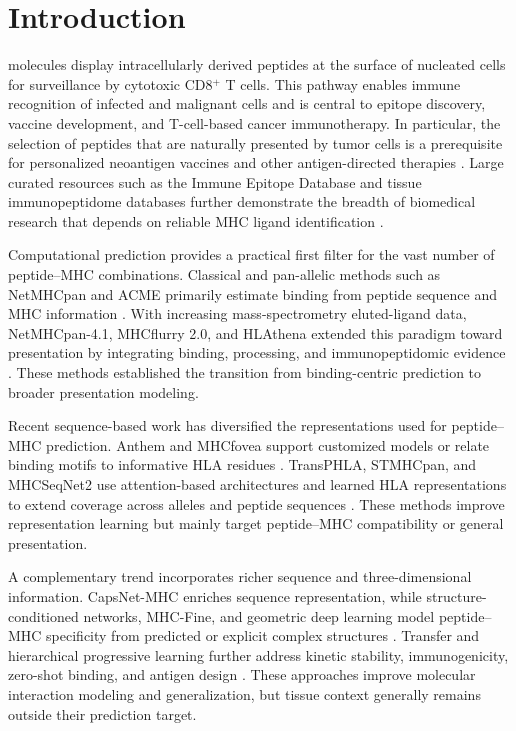 \section{Introduction}

\plainMHCI{} molecules display intracellularly derived peptides at the surface of nucleated cells for surveillance by cytotoxic CD8\(^{+}\) T cells. This pathway enables immune recognition of infected and malignant cells and is central to epitope discovery, vaccine development, and T-cell-based cancer immunotherapy. In particular, the selection of peptides that are naturally presented by tumor cells is a prerequisite for personalized neoantigen vaccines and other antigen-directed therapies \cite{ott2017neoantigen,sahin2017mutanome,marcu2021atlas}. Large curated resources such as the Immune Epitope Database and tissue immunopeptidome databases further demonstrate the breadth of biomedical research that depends on reliable MHC ligand identification \cite{vita2025iedb,lemke2025pcidb}.

Computational prediction provides a practical first filter for the vast number of peptide--MHC combinations. Classical and pan-allelic methods such as NetMHCpan and ACME primarily estimate binding from peptide sequence and MHC information \cite{nielsen2007netmhcpan,hu2019acme}. With increasing mass-spectrometry eluted-ligand data, NetMHCpan-4.1, MHCflurry 2.0, and HLAthena extended this paradigm toward presentation by integrating binding, processing, and immunopeptidomic evidence \cite{reynisson2020netmhcpan,odonnell2020mhcflurry,sarkizova2020hlathena}. These methods established the transition from binding-centric prediction to broader presentation modeling.

Recent sequence-based work has diversified the representations used for peptide--MHC prediction. Anthem and MHCfovea support customized models or relate binding motifs to informative HLA residues \cite{mei2021anthem,lee2021mhcfovea}. TransPHLA, STMHCpan, and MHCSeqNet2 use attention-based architectures and learned HLA representations to extend coverage across alleles and peptide sequences \cite{chu2022transphla,ye2023stmhcpan,wongklaew2024mhcseqnet2}. These methods improve representation learning but mainly target peptide--MHC compatibility or general presentation.

A complementary trend incorporates richer sequence and three-dimensional information. CapsNet-MHC enriches sequence representation, while structure-conditioned networks, MHC-Fine, and geometric deep learning model peptide--MHC specificity from predicted or explicit complex structures \cite{kalemati2023capsnet,motmaen2023structure,glukhov2024mhcfine,marzella2024geometric}. Transfer and hierarchical progressive learning further address kinetic stability, immunogenicity, zero-shot binding, and antigen design \cite{fasoulis2024transfer,zhu2025hierarchical}. These approaches improve molecular interaction modeling and generalization, but tissue context generally remains outside their prediction target.

